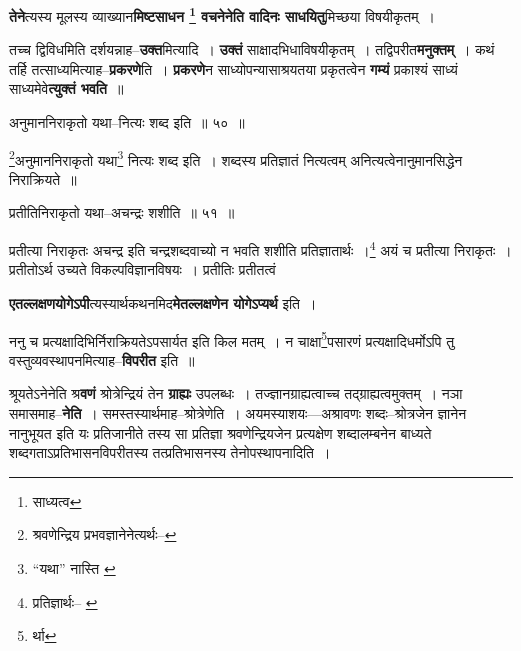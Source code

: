 \documentclass[article,12pt,a4paper]{memoir}
\begin{document}
	  \pstart \textbf{तेने}त्यस्य मूलस्य व्याख्यान\textbf{मिष्टसाधन \footnote{साध्यत्व} वचनेनेति वादिनः साधयितु}मिच्छया विषयीकृतम् ।
	\pend
      

	  \pstart तच्च द्विविधमिति दर्शयन्नाह--\textbf{उक्त}मित्यादि । \textbf{उक्तं} साक्षादभिधाविषयीकृतम् । तद्विपरीत\textbf{मनुक्तम्} । कथं तर्हि तत्साध्यमित्याह--\textbf{प्रकरणे}ति । \textbf{प्रकरणे}न साध्योपन्यासाश्रयतया प्रकृतत्वेन \textbf{गम्यं} प्रकाश्यं साध्यं साध्यमेवे\textbf{त्युक्तं भवति} ॥
	\pend
      \leavevmode{}
	  \bigskip
	  \begingroup
	
	  \bigskip
	  \begingroup
	

	  \pstart अनुमाननिराकृतो यथा--नित्यः शब्द इति ॥ ५० ॥
	\pend
      
	  \endgroup
	 

	  \pstart \footnote{श्रवणेन्द्रिय प्रभवज्ञानेनेत्यर्थः--\cite{dp-msD-n}}अनुमाननिराकृतो यथा\footnote{“यथा” नास्ति \cite{dp-msC} \cite{dp-msD} \cite{dp-edH} \cite{dp-edE} \cite{dp-edN}} नित्यः शब्द इति । शब्दस्य प्रतिज्ञातं नित्यत्वम् अनित्यत्वेनानुमानसिद्धेन निराक्रियते ॥
	\pend
       
	  \bigskip
	  \begingroup
	

	  \pstart प्रतीतिनिराकृतो यथा--अचन्द्रः शशीति ॥ ५१ ॥
	\pend
      
	  \endgroup
	 

	  \pstart प्रतीत्या निराकृतः अचन्द्र इति चन्द्रशब्दवाच्यो न भवति शशीति प्रतिज्ञातार्थः ।\footnote{प्रतिज्ञार्थः--\cite{dp-msC} \cite{dp-msD}} अयं च प्रतीत्या निराकृतः । प्रतीतोऽर्थ उच्यते विकल्पविज्ञानविषयः । प्रतीतिः प्रतीतत्वं
	\pend
      
	  \endgroup
	

	  \pstart \textbf{एतल्लक्षणयोगेऽपी}त्यस्यार्थकथनमिद\textbf{मेतल्लक्षणेन योगेऽप्यर्थ} इति ।
	\pend
      

	  \pstart ननु च प्रत्यक्षादिभिर्निराक्रियतेऽपसार्यत इति किल मतम् । न चाक्षा\footnote{र्था}पसारणं प्रत्यक्षादिधर्मोऽपि तु वस्तुव्यवस्थापनमित्याह--\textbf{विपरीत} इति ॥
	\pend
      

	  \pstart श्रूयतेऽनेनेति श्र\textbf{वणं} श्रोत्रेन्द्रियं तेन \textbf{ग्राह्यः} उपलब्धः । तज्ज्ञानग्राह्यत्वाच्च तद्ग्राह्यत्वमुक्तम् । नञा समासमाह--\textbf{नेति} । समस्तस्यार्थमाह--श्रोत्रेणेति । अयमस्याशयः—अश्रावणः शब्दः--श्रोत्रजे\leavevmode{}न ज्ञानेन नानुभूयत इति यः प्रतिजानीते तस्य सा प्रतिज्ञा श्रवणेन्द्रियजेन प्रत्यक्षेण शब्दालम्बनेन बाध्यते शब्दगताऽप्रतिभासनविपरीतस्य तत्प्रतिभासनस्य तेनोपस्थापनादिति ।
	\pend
      
\end{document}
